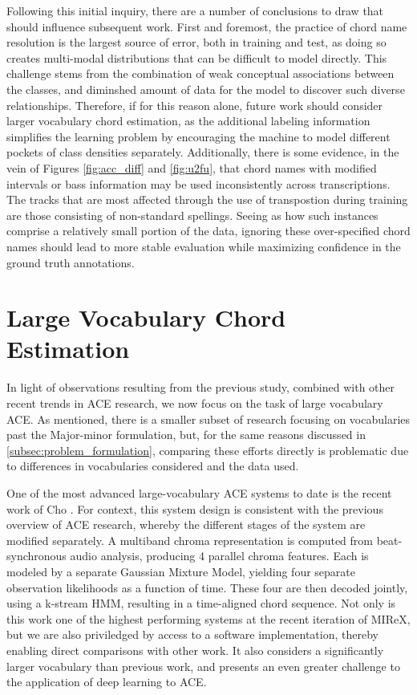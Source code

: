 Following this initial inquiry, there are a number of conclusions to draw that should influence subsequent work.
First and foremost, the practice of chord name resolution is the largest source of error, both in training and test, as doing so creates multi-modal distributions that can be difficult to model directly.
This challenge stems from the combination of weak conceptual associations between the classes, and diminshed amount of data for the model to discover such diverse relationships.
Therefore, if for this reason alone, future work should consider larger vocabulary chord estimation, as the additional labeling information simplifies the learning problem by encouraging the machine to model different pockets of class densities separately.
Additionally, there is some evidence, in the vein of Figures \ref{fig:acc_diff} and \ref{fig:u2fu}, that chord names with modified intervals or bass information may be used inconsistently across transcriptions.
The tracks that are most affected through the use of transpostion during training are those consisting of non-standard spellings.
Seeing as how such instances comprise a relatively small portion of the data, ignoring these over-specified chord names should lead to more stable evaluation while maximizing confidence in the ground truth annotations.


\section{Large Vocabulary Chord Estimation}
\label{subsec:large_vocabulary_ace}

In light of observations resulting from the previous study, combined with other recent trends in ACE research, we now focus on the task of large vocabulary ACE.
As mentioned, there is a smaller subset of research focusing on vocabularies past the Major-minor formulation, but, for the same reasons discussed in \ref{subsec:problem_formulation}, comparing these efforts directly is problematic due to differences in vocabularies considered and the data used.

One of the most advanced large-vocabulary ACE systems to date is the recent work of Cho \cite{Cho2014}.
For context, this system design is consistent with the previous overview of ACE research, whereby the different stages of the system are modified separately.
A multiband chroma representation is computed from beat-synchronous audio analysis, producing 4 parallel chroma features.
Each is modeled by a separate Gaussian Mixture Model, yielding four separate observation likelihoods as a function of time.
These four are then decoded jointly, using a k-stream HMM, resulting in a time-aligned chord sequence.
Not only is this work one of the highest performing systems at the recent iteration of MIReX, but we are also priviledged by access to a software implementation, thereby enabling direct comparisons with other work.
It also considers a significantly larger vocabulary than previous work, and presents an even greater challenge to the application of deep learning to ACE.


